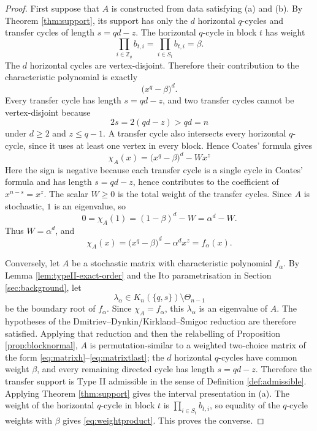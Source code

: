 \documentclass[11pt]{article}
\theoremstyle{definition}
\theoremstyle{remark}
\begin{document}
\begin{proof}
First suppose that $A$ is constructed from data satisfying (a) and (b).  By Theorem \ref{thm:support}, its support has only the $d$ horizontal $q$-cycles and transfer cycles of length $s=qd-z$.  The horizontal $q$-cycle in block $t$ has weight
\[
        \prod_{i\in\mathbb Z_q}b_{t,i}
        =\prod_{i\in S_t}b_{t,i}
        =\beta .
\]
The $d$ horizontal cycles are vertex-disjoint.  Therefore their contribution to the characteristic polynomial is exactly
\[
        \bigl(x^q-\beta\bigr)^d .
\]
Every transfer cycle has length $s=qd-z$, and two transfer cycles cannot be vertex-disjoint because
\[
        2s=2(qd-z)>qd=n
\]
under $d\ge2$ and $z\le q-1$.  A transfer cycle also intersects every horizontal $q$-cycle, since it uses at least one vertex in every block.  Hence Coates' formula gives
\[
        \chi_A(x)=\bigl(x^q-\beta\bigr)^d-Wx^z
\]
Here the sign is negative because each transfer cycle is a single cycle in
Coates' formula and has length $s=qd-z$, hence contributes to the
coefficient of $x^{n-s}=x^z$.  The scalar $W\ge0$ is the total weight of
the transfer cycles.  Since $A$ is stochastic, $1$ is an eigenvalue, so
\[
        0=\chi_A(1)=(1-\beta)^d-W=\alpha^d-W .
\]
Thus $W=\alpha^d$, and
\[
        \chi_A(x)=\bigl(x^q-\beta\bigr)^d-\alpha^d x^z=f_\alpha(x).
\]

Conversely, let $A$ be a stochastic matrix with characteristic polynomial
$f_\alpha$.  By Lemma \ref{lem:typeII-exact-order} and the Ito parametrisation
in Section \ref{sec:background}, let
\[
        \lambda_\alpha\in K_n(\{q,s\})\setminus\Theta_{n-1}
\]
be the boundary root of $f_\alpha$.  Since $\chi_A=f_\alpha$, this
$\lambda_\alpha$ is an eigenvalue of $A$.  The hypotheses of the
Dmitriev--Dynkin/Kirkland--\v Smigoc reduction are therefore satisfied.
Applying that reduction and then the relabelling of Proposition
\ref{prop:blocknormal}, $A$ is permutation-similar to a weighted two-choice
matrix of the form \eqref{eq:matrixh}--\eqref{eq:matrixtlast}; the $d$
horizontal $q$-cycles have common weight $\beta$, and every remaining directed
cycle has length $s=qd-z$.  Therefore the transfer support is Type II
admissible in the sense of Definition \ref{def:admissible}.  Applying Theorem
\ref{thm:support} gives the interval presentation in (a).  The weight of the
horizontal $q$-cycle in block $t$ is $\prod_{i\in S_t}b_{t,i}$, so equality of
the $q$-cycle weights with $\beta$ gives \eqref{eq:weightproduct}.  This proves
the converse.
\end{proof}
\end{document}
